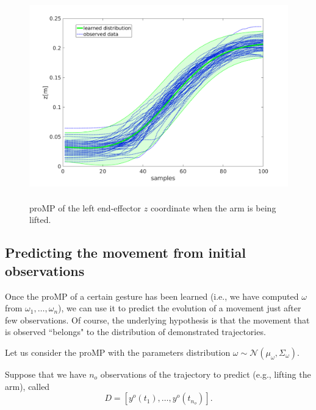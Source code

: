 \begin{figure}[h]
\centering
\includegraphics[height=9cm]{figs/proMPz.pdf}
\caption{proMP of the left end-effector $z$ coordinate when the arm is being lifted.}
\label{fig:proMPlifting}
\end{figure}





\subsection{Predicting the movement from initial observations}

Once the proMP of a certain gesture has been learned (i.e., we have computed $\omega$ from $\omega_1, \ldots, \omega_n$), we can use it to predict the evolution of a movement just after few observations. Of course, the underlying hypothesis is that the movement that is observed ``belongs" to the distribution of demonstrated trajectories.

Let us consider the proMP with the parameters distribution $\omega \sim \mathcal{N}(\mu_\omega, \Sigma_\omega)$.  

Suppose that we have $n_o$ observations of the trajectory to predict (e.g., lifting the arm), called 
$$D=[y^o(t_1),\ldots, y^o(t_{n_o})].$$

